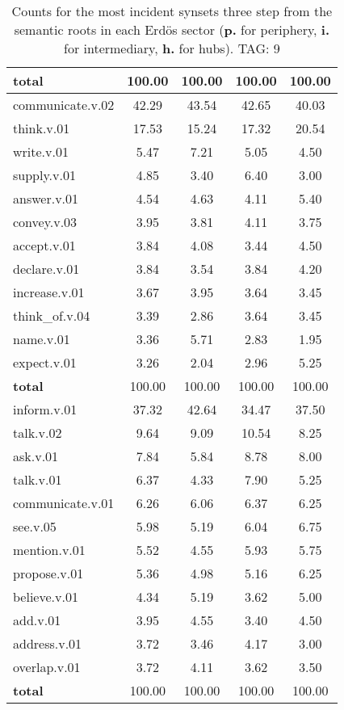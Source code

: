 \begin{table}[h!]
\begin{center}
\begin{tabular}{| l || c | c | c | c |}
{{\bf total}} & 100.00  & 100.00  & 100.00  & 100.00 \\\hline\hline\hline
communicate.v.02 & 42.29  & 43.54  & 42.65  & 40.03 \\\hline
think.v.01 & 17.53  & 15.24  & 17.32  & 20.54 \\\hline
write.v.01 & 5.47  & 7.21  & 5.05  & 4.50 \\\hline
supply.v.01 & 4.85  & 3.40  & 6.40  & 3.00 \\\hline
answer.v.01 & 4.54  & 4.63  & 4.11  & 5.40 \\\hline
convey.v.03 & 3.95  & 3.81  & 4.11  & 3.75 \\\hline
accept.v.01 & 3.84  & 4.08  & 3.44  & 4.50 \\\hline
declare.v.01 & 3.84  & 3.54  & 3.84  & 4.20 \\\hline
increase.v.01 & 3.67  & 3.95  & 3.64  & 3.45 \\\hline
think\_of.v.04 & 3.39  & 2.86  & 3.64  & 3.45 \\\hline
name.v.01 & 3.36  & 5.71  & 2.83  & 1.95 \\\hline
expect.v.01 & 3.26  & 2.04  & 2.96  & 5.25 \\\hline\hline
{{\bf total}} & 100.00  & 100.00  & 100.00  & 100.00 \\\hline\hline\hline
inform.v.01 & 37.32  & 42.64  & 34.47  & 37.50 \\\hline
talk.v.02 & 9.64  & 9.09  & 10.54  & 8.25 \\\hline
ask.v.01 & 7.84  & 5.84  & 8.78  & 8.00 \\\hline
talk.v.01 & 6.37  & 4.33  & 7.90  & 5.25 \\\hline
communicate.v.01 & 6.26  & 6.06  & 6.37  & 6.25 \\\hline
see.v.05 & 5.98  & 5.19  & 6.04  & 6.75 \\\hline
mention.v.01 & 5.52  & 4.55  & 5.93  & 5.75 \\\hline
propose.v.01 & 5.36  & 4.98  & 5.16  & 6.25 \\\hline
believe.v.01 & 4.34  & 5.19  & 3.62  & 5.00 \\\hline
add.v.01 & 3.95  & 4.55  & 3.40  & 4.50 \\\hline
address.v.01 & 3.72  & 3.46  & 4.17  & 3.00 \\\hline
overlap.v.01 & 3.72  & 4.11  & 3.62  & 3.50 \\\hline\hline
{{\bf total}} & 100.00  & 100.00  & 100.00  & 100.00 \\\hline
\end{tabular}
\caption{Counts for the most incident synsets three step from the semantic roots in each Erd\"os sector ({\bf p.} for periphery, {\bf i.} for intermediary, {\bf h.} for hubs). TAG: 9}
\end{center}
\end{table}